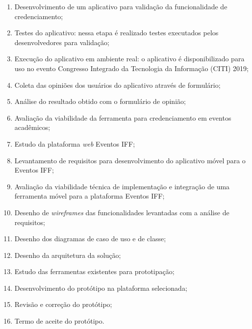 \begin{enumerate}
  \item Desenvolvimento de um aplicativo para validação da funcionalidade de credenciamento;
  \item Testes do aplicativo: nessa etapa é realizado testes executados pelos desenvolvedores para validação;
  \item Execução do aplicativo em ambiente real: o aplicativo é disponibilizado para uso no evento Congresso Integrado da Tecnologia da Informação (CITI) 2019;
  \item Coleta das opiniões dos usuários do aplicativo através de formulário;
  \item Análise do resultado obtido com o formulário de opinião;
  \item Avaliação da viabilidade da ferramenta para credenciamento em eventos acadêmicos;
  \item Estudo da plataforma \textit{web} Eventos IFF;
  \item Levantamento de requisitos para desenvolvimento do aplicativo móvel para o Eventos IFF;
  \item Avaliação da viabilidade técnica de implementação e integração de uma ferramenta móvel para a plataforma Eventos IFF;
  \item Desenho de \textit{wireframes} das funcionalidades levantadas com a análise de requisitos;
  \item Desenho dos diagramas de caso de uso e de classe;
  \item Desenho da arquitetura da solução;
  \item Estudo das ferramentas existentes para prototipação;
  \item Desenvolvimento do protótipo na plataforma selecionada;
  \item Revisão e correção do protótipo;
  \item Termo de aceite do protótipo.
\end{enumerate}